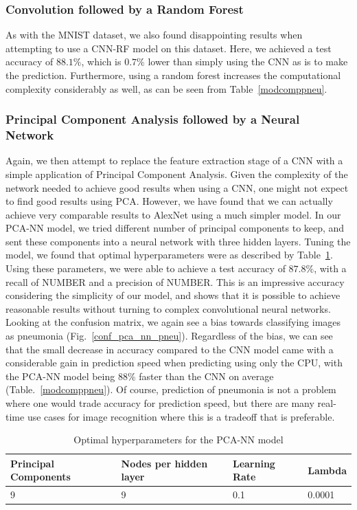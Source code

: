 \documentclass[onecolumn,10pt,cleanfoot]{asme2ej}
\begin{document}
\subsubsection{Convolution followed by a Random Forest}

As with the MNIST dataset, we also found disappointing results when attempting to use a CNN-RF model on this dataset. Here, we achieved a test accuracy of $88.1\%$, which is $0.7\%$ lower than simply using the CNN as is to make the prediction. Furthermore, using a random forest increases the computational complexity considerably as well, as can be seen from Table~\ref{modcomppneu}.

\subsubsection{Principal Component Analysis followed by a Neural Network}

Again, we then attempt to replace the feature extraction stage of a CNN with a simple application of Principal Component Analysis. Given the complexity of the network needed to achieve good results when using a CNN, one might not expect to find good results using PCA. However, we have found that we can actually achieve very comparable results to AlexNet using a much simpler model. In our PCA-NN model, we tried different number of principal components to keep, and sent these components into a neural network with three hidden layers. Tuning the model, we found that optimal hyperparameters were as described by Table~\ref{pcanntable}. Using these parameters, we were able to achieve a test accuracy of $87.8\%$, with a recall of NUMBER and a precision of NUMBER. This is an impressive accuracy considering the simplicity of our model, and shows that it is possible to achieve reasonable results without turning to complex convolutional neural networks. Looking at the confusion matrix, we again see a bias towards classifying images as pneumonia (Fig.~\ref{conf_pca_nn_pneu}). Regardless of the bias, we can see that the small decrease in accuracy compared to the CNN model came with a considerable gain in prediction speed when predicting using only the CPU, with the PCA-NN model being $88\%$ faster than the CNN on average (Table.~\ref{modcomppneu}). Of course, prediction of pneumonia is not a problem where one would trade accuracy for prediction speed, but there are many real-time use cases for image recognition where this is a tradeoff that is preferable.

\begin{table}[H]
\caption{Optimal hyperparameters for the PCA-NN model}
\begin{center}
\label{pcanntable}
\begin{tabular}{| l | l | l | l |}
\hline
Principal Components & Nodes per hidden layer & Learning Rate & Lambda \\
\hline
9 & 9 & 0.1 & 0.0001 \\
\hline
\end{tabular}
\end{center}
\end{table}
\end{document}
